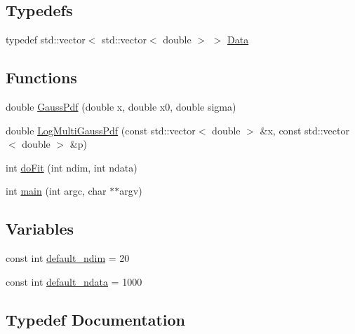 \subsection*{Typedefs}
\begin{DoxyCompactItemize}
\item 
typedef std\+::vector$<$ std\+::vector$<$ double $>$ $>$ \mbox{\hyperlink{adat-devel_2other__libs_2minuit_2test_2MnSim_2ParallelTest_8cxx_a1766b42441c3f4d78bb2b56263a8e058}{Data}}
\end{DoxyCompactItemize}
\subsection*{Functions}
\begin{DoxyCompactItemize}
\item 
double \mbox{\hyperlink{adat-devel_2other__libs_2minuit_2test_2MnSim_2ParallelTest_8cxx_a8d06db116c17441efc94ec186e960754}{Gauss\+Pdf}} (double x, double x0, double sigma)
\item 
double \mbox{\hyperlink{adat-devel_2other__libs_2minuit_2test_2MnSim_2ParallelTest_8cxx_a3dbc0f5a3a5823d5a68abacc83894768}{Log\+Multi\+Gauss\+Pdf}} (const std\+::vector$<$ double $>$ \&x, const std\+::vector$<$ double $>$ \&p)
\item 
int \mbox{\hyperlink{adat-devel_2other__libs_2minuit_2test_2MnSim_2ParallelTest_8cxx_ad2424cde5fec20b83f95e54a5f134ad6}{do\+Fit}} (int ndim, int ndata)
\item 
int \mbox{\hyperlink{adat-devel_2other__libs_2minuit_2test_2MnSim_2ParallelTest_8cxx_a3c04138a5bfe5d72780bb7e82a18e627}{main}} (int argc, char $\ast$$\ast$argv)
\end{DoxyCompactItemize}
\subsection*{Variables}
\begin{DoxyCompactItemize}
\item 
const int \mbox{\hyperlink{adat-devel_2other__libs_2minuit_2test_2MnSim_2ParallelTest_8cxx_a8818f1ae401e3d26fb04dfdf8bf4a28c}{default\+\_\+ndim}} = 20
\item 
const int \mbox{\hyperlink{adat-devel_2other__libs_2minuit_2test_2MnSim_2ParallelTest_8cxx_a1baf269816008e501e2f2bc367db1a33}{default\+\_\+ndata}} = 1000
\end{DoxyCompactItemize}


\subsection{Typedef Documentation}
\mbox{\label{adat-devel_2other__libs_2minuit_2test_2MnSim_2ParallelTest_8cxx_a1766b42441c3f4d78bb2b56263a8e058}} 
